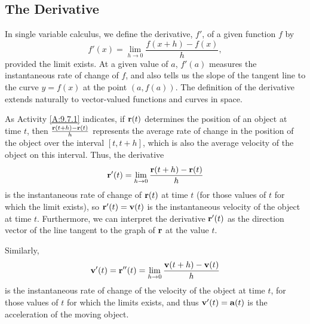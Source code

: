 

\subsection*{The Derivative}

In single variable calculus, we define the derivative, $f'$, of a
given function $f$ by
$$f'(x) = \lim_{h \to 0} \frac{f(x+h) - f(x)}{h},$$
provided the limit exists.  At a given value of $a$, $f'(a)$ measures
the instantaneous rate of change of $f$, and also tells us the slope
of the tangent line to the curve $y = f(x)$ at the point $(a, f(a))$.
The definition of the derivative extends naturally to vector-valued
functions and curves in space.

\vspace*{5pt} \nin {} \vspace*{5pt}



As Activity \ref{A:9.7.1} indicates, if $\mathbf{r}(t)$ determines the
position of an object at time $t$, then $\frac{\mathbf{r}(t+h)-\mathbf{r}(t)}{h}$
represents the average rate of change in the position of the object over the
interval $[t,t+h]$, which is also the average velocity of the object
on this interval.  Thus, the derivative
\[\mathbf{r}'(t) = \lim_{h \to 0} \frac{\mathbf{r}(t+h)-\mathbf{r}(t)}{h}\] is the
instantaneous rate of change of $\mathbf{r}(t)$ at time $t$ (for those values
of $t$ for which the limit exists), so $\mathbf{r}'(t) = \mathbf{v}(t)$ is the
instantaneous velocity of the object at time $t$.  Furthermore, we can
interpret the derivative $\mathbf{r}'(t)$ as the direction vector of the line
tangent to the graph of $\mathbf{r}$ at the value $t$.

Similarly,
\[\mathbf{v}'(t) = \mathbf{r}''(t) = \lim_{h \to 0} \frac{\mathbf{v}(t+h)-\mathbf{v}(t)}{h}\] is
the instantaneous rate of change of the velocity of the object at time
$t$, for those values of $t$ for which the limits exists, and thus
$\mathbf{v}'(t) = \mathbf{a}(t)$ is the acceleration of the moving object. 

